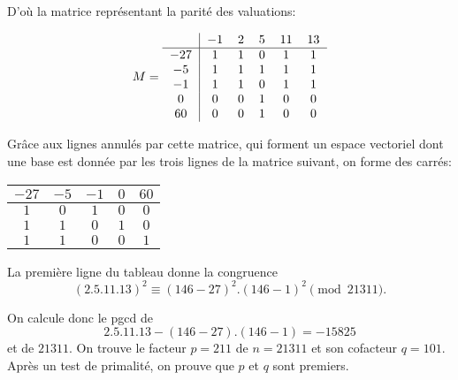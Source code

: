 \documentclass[french, 12pt, titlepage]{article}
\begin{document}
D'où la matrice représentant la parité des valuations:

\[ M = 
\begin{tabular}{c|ccccc}
 & $-1$ & $2$ & $5$ & $11$ & $13$\\
\hline
$-27$ & $1$ & $1$ & $0$ & $1$ & $1$\\
$ -5$ & $1$ & $1$ & $1$ & $1$ & $1$\\
$-1$ & $1$ & $1$ & $0$ & $1$ & $1$\\
$0$ & $0$ & $0$ & $1$ & $0$ & $0$\\
$60$ & $0$ & $0$ & $1$ & $0$ & $0$\\
\end{tabular}
\]

Grâce aux lignes annulés par cette matrice, qui forment un espace vectoriel dont une base est donnée par les trois lignes de la matrice suivant, on forme des carrés:

\begin{center}
\begin{tabular}{ccccc}
 $-27$ & $-5$ & $-1$ & $0$ & $60$\\
\hline
$1$ & $0$ & $1$ & $0$ & $0$\\
$1$ & $1$ & $0$ & $1$ & $0$\\
$1$ & $1$ & $0$ & $0$ & $1$\\
\end{tabular}
\end{center}

La première ligne du tableau donne la congruence \[ (2.5.11.13)^2 \equiv (146 - 27)^2.(146 - 1)^2 \pmod{21311} .\]

On calcule donc le pgcd de \[ 2.5.11.13 - (146 - 27).(146 - 1) = -15825 \] et de $21311.$ On trouve le facteur $p = 211$ de $n = 21311$ et son cofacteur $q = 101.$
Après un test de primalité, on prouve que $p$ et $q$ sont premiers.  
\end{document}
